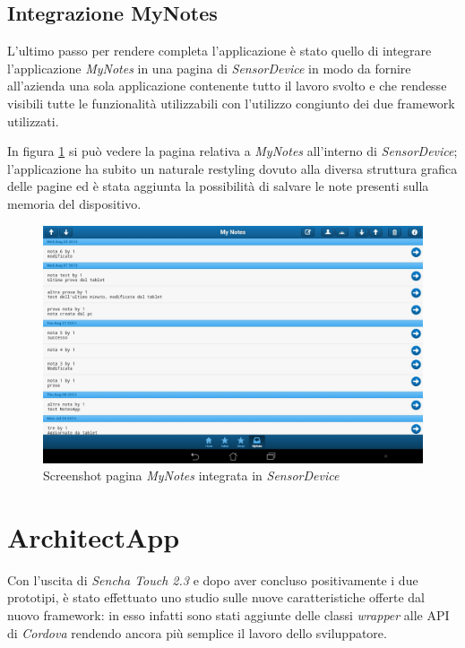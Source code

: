 \subsection{Integrazione MyNotes}
L'ultimo passo per rendere completa l'applicazione è stato quello di integrare l'applicazione \emph{MyNotes} in una pagina di \emph{SensorDevice} in modo da fornire all'azienda una sola applicazione contenente tutto il lavoro svolto e che rendesse visibili tutte le funzionalità utilizzabili con l'utilizzo congiunto dei due framework utilizzati.

In figura \ref{fig:screenshot mynotes sensordevice} si può vedere la pagina relativa a \emph{MyNotes} all'interno di \emph{SensorDevice}; l'applicazione ha subito un naturale restyling dovuto alla diversa struttura grafica delle pagine ed è stata aggiunta la possibilità di salvare le note presenti sulla memoria del dispositivo.

\begin{figure}[htb]
\centering
\includegraphics[scale=0.25]{gfx/screenshot/screen_sensor_myNotes}
\caption{Screenshot pagina \emph{MyNotes} integrata in \emph{SensorDevice}}
\label{fig:screenshot mynotes sensordevice}
\end{figure}

\section{ArchitectApp}
Con l'uscita di \emph{Sencha Touch 2.3} \cite{sencha:touch23} e dopo aver concluso positivamente i due prototipi, è stato effettuato uno studio sulle nuove caratteristiche offerte dal nuovo framework: in esso infatti sono stati aggiunte delle classi \emph{wrapper} alle \ac{API} di \emph{Cordova} rendendo ancora più semplice il lavoro dello sviluppatore.

